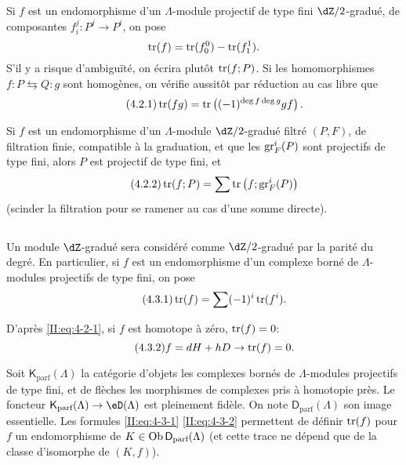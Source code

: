 Si $f$ est un endomorphisme d'un $\Lambda$-module projectif de type fini 
$\dZ/2$-gradué, de composantes $f_i^j:P^j\to P^i$, on pose 
\[
  \operatorname{tr}(f) = \operatorname{tr}(f_0^0) - \operatorname{tr}(f_1^1) \text{.}
\]
S'il y a risque d'ambiguïté, on écrira plutôt $\operatorname{tr}(f;P)$. Si les 
homomorphismes $f:P\leftrightarrows Q:g$ sont homogènes, on vérifie 
aussitôt par réduction au cas libre que 
\begin{equation*}\tag{4.2.1}\label{II:eq:4-2-1}
  \operatorname{tr}(f g) = \operatorname{tr}\left((-1)^{\deg f \deg g} g f\right) \text{.}
\end{equation*}

Si $f$ est un endomorphisme d'un $\Lambda$-module $\dZ/2$-gradué filtré 
$(P,F)$, de filtration finie, compatible à la graduation, et que les 
$\operatorname{gr}_F^i(P)$ sont projectifs de type fini, alors $P$ est projectif de type 
fini, et 
\begin{equation*}\tag{4.2.2}\label{II:eq:4-2-2}
  \operatorname{tr}(f;P) = \sum \operatorname{tr}\left(f; \operatorname{gr}_F^i(P) \right)
\end{equation*}
(scinder la filtration pour se ramener au cas d'une somme directe). 





\subsection{}\label{II:4-3}

Un module $\dZ$-gradué sera considéré comme $\dZ/2$-gradué par la 
parité du degré. En particulier, si $f$ est un endomorphisme d'un complexe 
borné de $\Lambda$-modules projectifs de type fini, on pose 
\begin{equation*}\tag{4.3.1}\label{II:eq:4-3-1}
  \operatorname{tr}(f) = \sum (-1)^i \operatorname{tr}(f^i) \text{.}
\end{equation*}

D'après \eqref{II:eq:4-2-1}, si $f$ est homotope à zéro, $\operatorname{tr}(f) = 0$: 
\begin{equation*}\tag{4.3.2}\label{II:eq:4-3-2}
  f = d H + h D \rightarrow \operatorname{tr}(f) = 0 \text{.}
\end{equation*}

Soit $\mathsf{K}_\text{parf}(\Lambda)$ la catégorie d'objets les complexes 
bornés de $\Lambda$-modules projectifs de type fini, et de flèches les 
morphismes de complexes pris à homotopie près. Le foncteur 
$\mathsf{K}_\text{parf}(\Lambda)\to\eD(\Lambda)$ est pleinement fidèle. On note 
$\mathsf{D}_\text{parf}(\Lambda)$ son image essentielle. Les formules 
\eqref{II:eq:4-3-1} \eqref{II:eq:4-3-2} permettent de définir $\operatorname{tr}(f)$ pour $f$ 
un endomorphisme de $K\in\operatorname{Ob} \mathsf{D}_\text{parf}(\Lambda)$ (et cette trace ne 
dépend que de la classe d'isomorphe de $(K,f)$). 





